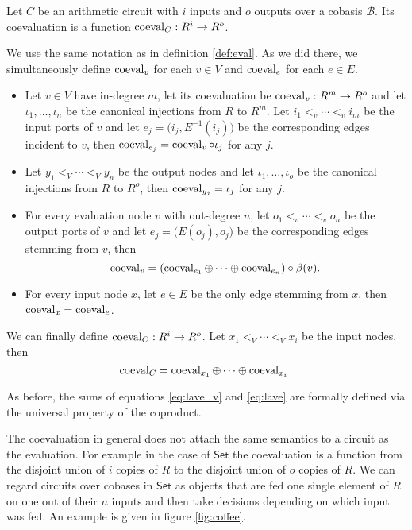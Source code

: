 \begin{definition}
  \label{def:coeval}
  Let $C$ be an arithmetic circuit with $i$ inputs and $o$ outputs
  over a cobasis $\mathcal{B}$. Its coevaluation is a function
  $\operatorname{coeval}_C:R^i\rightarrow R^o$.

  We use the same notation as in definition \ref{def:eval}. As we did
  there, we simultaneously define $\operatorname{coeval}_v$ for each $v\in V$ and
  $\operatorname{coeval}_e$ for each $e\in E$.
  \begin{itemize}
  \item Let $v\in V$ have in-degree $m$, let its coevaluation be
    $\operatorname{coeval}_v:R^m\rightarrow R^o$ and let $\iota_1,\ldots,\iota_n$ be the
    canonical injections from $R$ to $R^m$. Let $i_1<_v\cdots<_vi_m$
    be the input ports of $v$ and let
    $e_j=\bigl(i_j,E^{-1}(i_j)\bigr)$ be the corresponding edges
    incident to $v$, then $\operatorname{coeval}_{e_j} = \operatorname{coeval}_v\circ\iota_j$ for any
    $j$.
  \item Let $y_1<_V\cdots<_Vy_n$ be the output nodes and let
    $\iota_1,\ldots,\iota_o$ be the canonical injections from $R$ to
    $R^o$, then $\operatorname{coeval}_{y_j}=\iota_j$ for any $j$.
  \item For every evaluation node $v$ with out-degree $n$, let
    $o_1<_v\cdots<_vo_n$ be the output ports of $v$ and let
    $e_j=\bigl(E(o_j),o_j\bigr)$ be the corresponding edges
    stemming from $v$, then
    \begin{equation}
      \label{eq:lave_v}
      \operatorname{coeval}_v = (\operatorname{coeval}_{e_1} \oplus \cdots \oplus \operatorname{coeval}_{e_n}) \circ \beta(v) 
      \text{.}
    \end{equation}
  \item For every input node $x$, let $e\in E$ be the only edge
    stemming from $x$, then $\operatorname{coeval}_x=\operatorname{coeval}_e$.
  \end{itemize}

  We can finally define $\operatorname{coeval}_C:R^i\rightarrow R^o$. Let $x_1<_V\cdots<_Vx_i$
  be the input nodes, then
  \begin{equation}
    \label{eq:lave}
    \operatorname{coeval}_C = \operatorname{coeval}_{x_1} \oplus \cdots \oplus \operatorname{coeval}_{x_i}
    \text{.}
  \end{equation}
\end{definition}

As before, the sums of equations \eqref{eq:lave_v} and \eqref{eq:lave}
are formally defined via the universal property of the coproduct.

The coevaluation in general does not attach the same semantics to a
circuit as the evaluation. For example in the case of $\mathsf{Set}$
the coevaluation is a function from the disjoint union of $i$ copies
of $R$ to the disjoint union of $o$ copies of $R$. We can regard
circuits over cobases in $\mathsf{Set}$ as objects that are fed one
single element of $R$ on one out of their $n$ inputs and then take
decisions depending on which input was fed. An example is given in
figure \ref{fig:coffee}.

